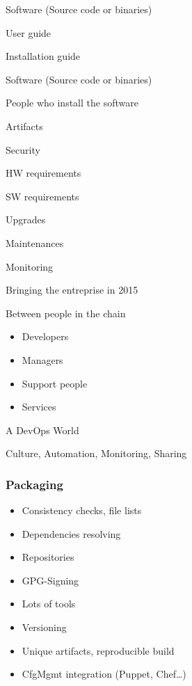 \begin{iframe}
\item Software (Source code or binaries)
\item User guide
\item Installation guide
\end{iframe}

\begin{iframe}
\item Software (Source code or binaries)
\item People who install the software
\end{iframe}

\begin{iframe}
\item Artifacts
\item Security
\item HW requirements
\item SW requirements
\item Upgrades
\item Maintenances
\item Monitoring
\end{iframe}
\begin{iframe}
\item Bringing the entreprise in 2015
\item Between people in the chain
    \begin{itemize}
        \item Developers
        \item Managers
        \item Support people
        \item Services
    \end{itemize}
\item A DevOps World
\item Culture, Automation, Monitoring, Sharing
\end{iframe}

\begin{frame}
    \frametitle{Packaging}
    \begin{itemize}
        \item {Consistency checks, file lists}
        \item {Dependencies resolving}
        \item {Repositories}
        \item {GPG-Signing}
        \item {Lots of tools}
        \item {Versioning}
        \item {Unique artifacts, reproducible build}
        \item{CfgMgmt integration (Puppet, Chef\dots)}
    \end{itemize}
\end{frame}

